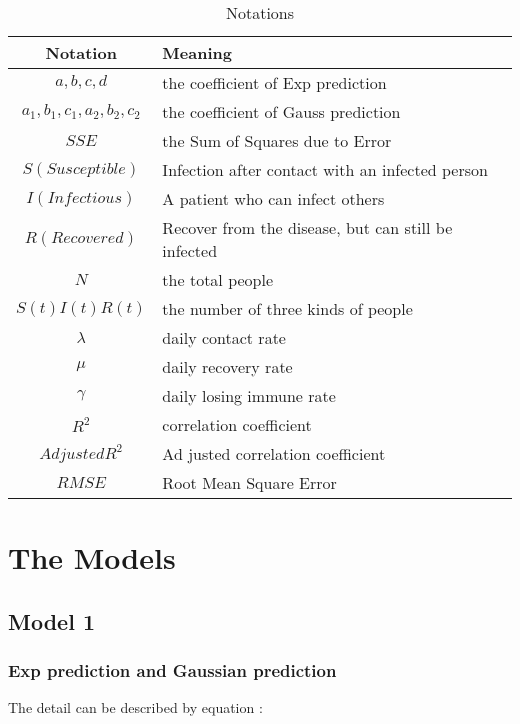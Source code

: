 \documentclass[12pt]{article}  %
\begin{document}
\begin{table}[!htbp]
	\begin{center}
		\caption{Notations}
		\begin{tabular}{cl}
			\toprule
			\multicolumn{1}{m{3cm}}{\centering Notation}
			&\multicolumn{1}{m{8cm}}{\centering Meaning}\\
			\midrule
			$ a,b,c,d $ &   \qquad\qquad\qquad the coefficient of Exp prediction\\
			$ a_1, b_1, c_1, a_2, b_2, c_2 $ &   \qquad\qquad\qquad the coefficient of Gauss prediction \\
			$SSE$ &  \qquad\qquad\qquad  the Sum of Squares due to Error\\
			$S (Susceptible)$&   \qquad\qquad\qquad Infection after contact with an infected person\\
			$I (Infectious)$&   \qquad\qquad\qquad A patient who can infect others\\
			$R (Recovered)$ &  \qquad\qquad\qquad  Recover from the disease, but can still be infected\\
			$N$& \qquad\qquad\qquad the total people\\
			$S(t) I(t) R(t)$& \qquad\qquad\qquad the number of three kinds of people\\
			$\lambda$& \qquad\qquad\qquad daily contact rate\\
			$\mu$& \qquad\qquad\qquad daily recovery rate\\
			$\gamma$& \qquad\qquad\qquad daily losing immune rate\\
			$R^{2}$& \qquad\qquad\qquad correlation coefficient\\
			$Ad justed R^{2}$& \qquad\qquad\qquad Ad justed correlation coefficient\\
			$RMSE$& \qquad\qquad\qquad Root Mean Square Error\\
			\bottomrule
		\end{tabular}\label{tb:notations}
	\end{center}
\end{table}


\clearpage
\section{The Models}
\subsection{Model 1}
\subsubsection{Exp prediction and Gaussian prediction}
The detail can be described by equation :
\end{document}
